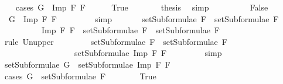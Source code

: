 \begin{isabellebody}
\ \ \isamarkupfalse%
\ {\isacharparenleft}cases\ {\isachardoublequoteopen}G\ {\isacharequal}\ Imp\ F{}\ F{}{\isachardoublequoteclose}{\isacharparenright}\isanewline
\ \ \ \ \isamarkupfalse%
\ True\isanewline
\ \ \ \ \isamarkupfalse%
\ \isamarkupfalse%
\ {\isacharquery}thesis\ \isamarkupfalse%
\ simp\ %
\isanewline
\ \ \isamarkupfalse%
\isanewline
\ \ \ \ \isamarkupfalse%
\ False\isanewline
\ \ \ \ \isamarkupfalse%
\ \isamarkupfalse%
\ {}{\isacharcolon}\ {\isachardoublequoteopen}G\ {\isasymnoteq}\ Imp\ F{}\ F{}{\isachardoublequoteclose}\ \isanewline
\ \ \ \ \ \ \isamarkupfalse%
\ simp\ %
\isanewline
\ \ \ \ \isamarkupfalse%
\ {\isachardoublequoteopen}setSubformulae\ F{}\ {\isasymunion}\ setSubformulae\ F{}\ {\isasymsubseteq}\ \isanewline
\ \ \ \ \ \ \ \ \ \ {\isacharbraceleft}Imp\ F{}\ F{}{\isacharbraceright}\ {\isasymunion}\ {\isacharparenleft}setSubformulae\ F{}\ {\isasymunion}\ setSubformulae\ F{}{\isacharparenright}{\isachardoublequoteclose}\ \isanewline
\ \ \ \ \ \ \isamarkupfalse%
\ {\isacharparenleft}rule\ Un{\isacharunderscore}upper{}{\isacharparenright}\isanewline
\ \ \ \ \isamarkupfalse%
\ \isamarkupfalse%
\ {}{\isacharcolon}\ {\isachardoublequoteopen}setSubformulae\ F{}\ {\isasymunion}\ setSubformulae\ F{}\ {\isasymsubseteq}\ \isanewline
\ \ \ \ \ \ \ \ \ \ \ \ \ \ \ \ \ \ setSubformulae\ {\isacharparenleft}Imp\ F{}\ F{}{\isacharparenright}{\isachardoublequoteclose}\ \isanewline
\ \ \ \ \ \ \isamarkupfalse%
\ simp\ %
\isanewline
\ \ \ \ \isamarkupfalse%
\ \isamarkupfalse%
\ {\isachardoublequoteopen}setSubformulae\ G\ {\isasymsubseteq}\ setSubformulae\ {\isacharparenleft}Imp\ F{}\ F{}{\isacharparenright}{\isachardoublequoteclose}\isanewline
\ \ \ \ \isamarkupfalse%
\ {\isacharparenleft}cases\ {\isachardoublequoteopen}G\ {\isasymin}\ setSubformulae\ F{}{\isachardoublequoteclose}{\isacharparenright}\isanewline
\ \ \ \ \ \ \isamarkupfalse%
\ True\isanewline
\ \ \ \ \ \ \isamarkupfalse%
\ \isamarkupfalse%

\end{isabellebody}
